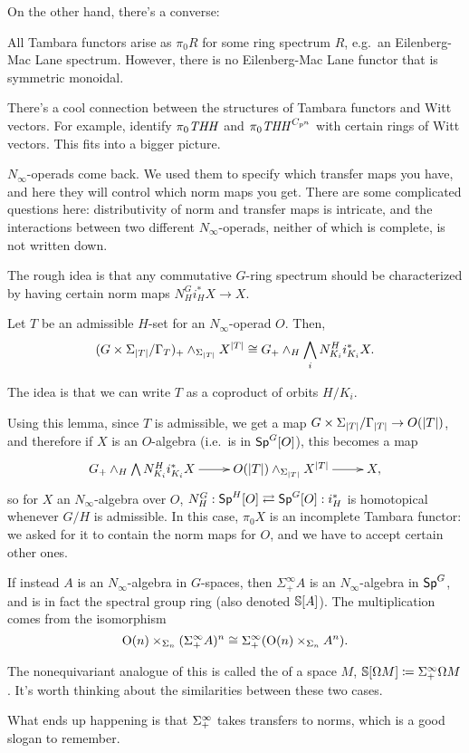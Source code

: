 On the other hand, there's a converse:
\begin{thm}
All Tambara functors arise as $\pi_0R$ for some ring spectrum $R$, e.g.\ an Eilenberg-Mac Lane spectrum. However,
there is no Eilenberg-Mac Lane functor that is symmetric monoidal.
\end{thm}
\begin{rem}
There's a cool connection between the structures of Tambara functors and Witt vectors. For example,
 identify $\pi_0\mathit{THH}$ and $\pi_0\mathit{THH}^{C_{p^n}}$ with certain rings of Witt vectors. This
fits into a bigger picture.
\end{rem}
$N_\infty$-operads come back. We used them to specify which transfer maps you have, and here they will control
which norm maps you get. There are some complicated questions here: distributivity of norm and transfer maps is
intricate, and the interactions between two different $N_\infty$-operads, neither of which is complete, is not
written down.

The rough idea is that any commutative $G$-ring spectrum should be characterized by having certain norm maps
$N_H^Gi_H^*X\to X$.
\begin{lem}
Let $T$ be an admissible $H$-set for an $N_\infty$-operad $O$. Then,
\[(G\times\Sigma_{\lvert T\rvert}/\Gamma_T)_+\wedge_{\Sigma_{\lvert T\rvert}} X^{\lvert T\rvert} \cong G_+\wedge_H \bigwedge_i
N_{K_i}^Hi_{K_i}^*X.\]
\end{lem}
The idea is that we can write $T$ as a coproduct of orbits $H/K_i$.

Using this lemma, since $T$ is admissible, we get a map $G\times\Sigma_{\lvert T\rvert}/\Gamma_{\lvert T\rvert}\to O(\lvert T\rvert)$, and
therefore if $X$ is an $O$-algebra (i.e.\ is in $\mathsf{Sp}^G[O]$), this becomes a map
\[\xymatrix{
	G_+\wedge_H\bigwedge N_{K_i}^H i_{K_i}^*X\ar[r] & O(\abs T)\wedge_{\Sigma_{\abs T}} X^{\abs T}\ar[r] & X,
}\]
so for $X$ an $N_\infty$-algebra over $O$, $N_H^G: \mathsf{Sp}^H[O]\rightleftarrows \mathsf{Sp}^G[O]: i_H^*$ is homotopical
whenever $G/H$ is admissible. In this case, $\pi_0X$ is an incomplete Tambara functor: we asked for it to contain
the norm maps for $O$, and we have to accept certain other ones.

If instead $A$ is an $N_\infty$-algebra in $G$-spaces, then $\Sigma_+^\infty A$ is an $N_\infty$-algebra in
$\mathsf{Sp}^G$, and is in fact the spectral group ring (also denoted $\mathbb S[A]$). The multiplication comes from the
isomorphism
\[\mathrm O(n)\times_{\Sigma_n} (\Sigma^\infty_+A)^n\cong \Sigma^\infty_+(\mathrm O(n)\times_{\Sigma_n} A^n).\]
\begin{rem}
The nonequivariant analogue of this is called the  of a space $M$, $\mathbb S[\Omega
M]\coloneqq \Sigma_+^\infty \Omega M$. It's worth thinking about the similarities between these two cases.
\end{rem}
What ends up happening is that $\Sigma^\infty_+$ takes transfers to norms, which is a good slogan to remember.

